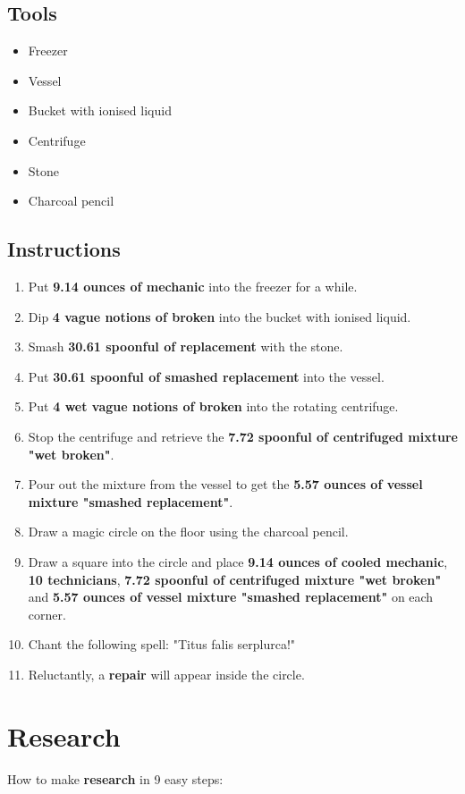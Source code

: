 \documentclass{article}
\begin{document}
\subsection{Tools}\begin{itemize}
\item 
Freezer
\item 
Vessel
\item 
Bucket with ionised liquid
\item 
Centrifuge
\item 
Stone
\item 
Charcoal pencil
\end{itemize}
\subsection{Instructions}\begin{enumerate}
\item 
Put \textbf{9.14 ounces of mechanic} into the freezer for a while.
\item 
Dip \textbf{4 vague notions of broken} into the bucket with ionised liquid.
\item 
Smash \textbf{30.61 spoonful of replacement} with the stone.
\item 
Put \textbf{30.61 spoonful of smashed replacement} into the vessel.
\item 
Put \textbf{4 wet vague notions of broken} into the rotating centrifuge.
\item 
Stop the centrifuge and retrieve the \textbf{7.72 spoonful of centrifuged mixture "wet broken"}.
\item 
Pour out the mixture from the vessel to get the \textbf{5.57 ounces of vessel mixture "smashed replacement"}.
\item 
Draw a magic circle on the floor using the charcoal pencil.
\item 
Draw a square into the circle and place \textbf{9.14 ounces of cooled mechanic}, \textbf{10 technicians}, \textbf{7.72 spoonful of centrifuged mixture "wet broken"} and \textbf{5.57 ounces of vessel mixture "smashed replacement"} on each corner.
\item 
Chant the following spell: "Titus falis serplurca!"
\item 
Reluctantly, a \textbf{repair} will appear inside the circle.
\end{enumerate}
\newpage
\section{Research}How to make \textbf{research} in 9 easy steps:
\end{document}
